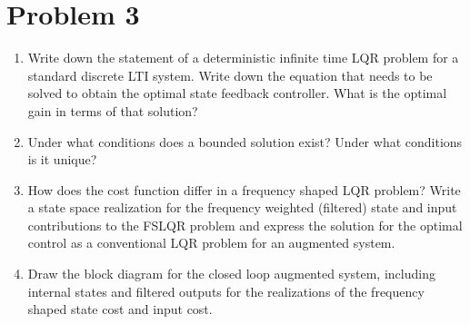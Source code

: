\section*{Problem 3}

\begin{enumerate}
    \item
    Write down the statement of a deterministic infinite time LQR problem
    for a standard discrete LTI system. Write down the equation that
    needs to be solved to obtain the optimal state feedback controller.
    What is the optimal gain in terms of that solution?
    \item
    Under what conditions does a bounded solution exist? Under what
    conditions is it unique?
    \item
    How does the cost function differ in a frequency shaped LQR problem?
    Write a state space realization for the frequency weighted (filtered)
    state and input contributions to the FSLQR problem and express the
    solution for the optimal control as a conventional LQR problem for
    an augmented system.
    \item
    Draw the block diagram for the closed loop augmented system,
    including internal states and filtered outputs for the realizations
    of the frequency shaped state cost and input cost.


\end{enumerate}
